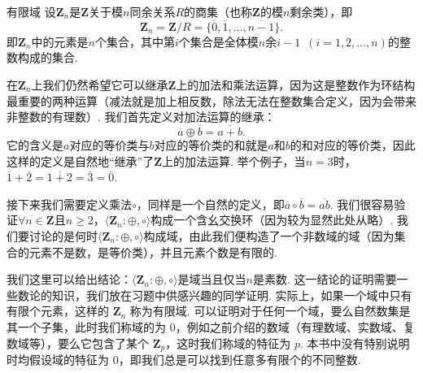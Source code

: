 \begin{example}{}{有限域}
    设$\mathbf{Z}_n$是$\mathbf{Z}$关于模$n$同余关系$R$的商集（也称$\mathbf{Z}$的模$n$剩余类），即
    \[\mathbf{Z}_n=\mathbf{Z}/R=\{\overline{0},\overline{1},\ldots,\overline{n-1}\}.\]
    即$\mathbf{Z}_n$中的元素是$n$个集合，其中第$i$个集合是全体模$n$余$i-1\enspace(i=1,2,\ldots,n)$的整数构成的集合.

    在$\mathbf{Z}_n$上我们仍然希望它可以继承$\mathbf{Z}$上的加法和乘法运算，因为这是整数作为环结构最重要的两种运算（减法就是加上相反数，除法无法在整数集合定义，因为会带来非整数的有理数）. 我们首先定义对加法运算的继承：
    \[\overline{a}\oplus\overline{b}=\overline{a+b}.\]
    它的含义是$a$对应的等价类与$b$对应的等价类的和就是$a$和$b$的和对应的等价类，因此这样的定义是自然地``继承''了$\mathbf{Z}$上的加法运算. 举个例子，当$n=3$时，$\overline{1}+\overline{2}=\overline{1+2}=\overline{3}=\overline{0}$.

    接下来我们需要定义乘法$\circ$，同样是一个自然的定义，即$\overline{a}\circ\overline{b}=\overline{ab}$. 我们很容易验证$\forall n\in\mathbf{Z}$且$n\geqslant 2$，$\langle \mathbf{Z}_n\colon\oplus,\circ\rangle$构成一个含幺交换环（因为较为显然此处从略）. 我们要讨论的是何时$\langle \mathbf{Z}_n\colon\oplus,\circ\rangle$构成域，由此我们便构造了一个非数域的域（因为集合的元素不是数，是等价类），并且元素个数是有限的.

    我们这里可以给出结论：$\langle \mathbf{Z}_n\colon\oplus,\circ\rangle$是域当且仅当$n$是素数. 这一结论的证明需要一些数论的知识，我们放在习题中供感兴趣的同学证明. 实际上，如果一个域中只有有限个元素，这样的 $\mathbf{Z}_n$ 称为有限域. 可以证明对于任何一个域，要么自然数集是其一个子集，此时我们称域的为 $0$，例如之前介绍的数域（有理数域、实数域、复数域等），要么它包含了某个 $\mathbf{Z}_p$，这时我们称域的特征为 $p$. 本书中没有特别说明时均假设域的特征为 $0$，即我们总是可以找到任意多有限个的不同整数.
\end{example}

